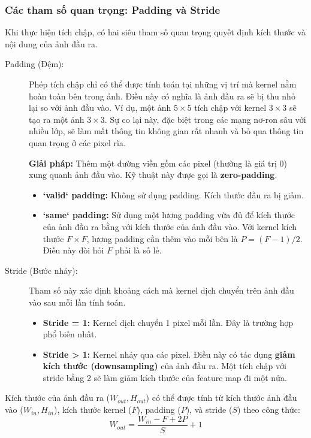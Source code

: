 \subsubsection{Các tham số quan trọng: Padding và Stride}
\label{subsubsec:padding_stride}
Khi thực hiện tích chập, có hai siêu tham số quan trọng quyết định kích thước và nội dung của ảnh đầu ra.
\begin{description}
    \item[Padding (Đệm):] Phép tích chập chỉ có thể được tính toán tại những vị trí mà kernel nằm hoàn toàn bên trong ảnh. Điều này có nghĩa là ảnh đầu ra sẽ bị thu nhỏ lại so với ảnh đầu vào. Ví dụ, một ảnh $5 \times 5$ tích chập với kernel $3 \times 3$ sẽ tạo ra một ảnh $3 \times 3$. Sự co lại này, đặc biệt trong các mạng nơ-ron sâu với nhiều lớp, sẽ làm mất thông tin không gian rất nhanh và bỏ qua thông tin quan trọng ở các pixel rìa.
    
    \textbf{Giải pháp:} Thêm một đường viền gồm các pixel (thường là giá trị 0) xung quanh ảnh đầu vào. Kỹ thuật này được gọi là \textbf{zero-padding}.
    \begin{itemize}
        \item \textbf{`valid` padding:} Không sử dụng padding. Kích thước đầu ra bị giảm.
        \item \textbf{`same` padding:} Sử dụng một lượng padding vừa đủ để kích thước của ảnh đầu ra bằng với kích thước của ảnh đầu vào. Với kernel kích thước $F \times F$, lượng padding cần thêm vào mỗi bên là $P = (F-1)/2$. Điều này đòi hỏi $F$ phải là số lẻ.
    \end{itemize}
    
    \item[Stride (Bước nhảy):] Tham số này xác định khoảng cách mà kernel dịch chuyển trên ảnh đầu vào sau mỗi lần tính toán.
    \begin{itemize}
        \item \textbf{Stride = 1:} Kernel dịch chuyển 1 pixel mỗi lần. Đây là trường hợp phổ biến nhất.
        \item \textbf{Stride > 1:} Kernel nhảy qua các pixel. Điều này có tác dụng \textbf{giảm kích thước (downsampling)} của ảnh đầu ra. Một tích chập với stride bằng 2 sẽ làm giảm kích thước của feature map đi một nửa.
    \end{itemize}
\end{description}

Kích thước của ảnh đầu ra ($W_{out}, H_{out}$) có thể được tính từ kích thước ảnh đầu vào ($W_{in}, H_{in}$), kích thước kernel ($F$), padding ($P$), và stride ($S$) theo công thức:
\begin{equation}
    W_{out} = \frac{W_{in} - F + 2P}{S} + 1
\end{equation}


